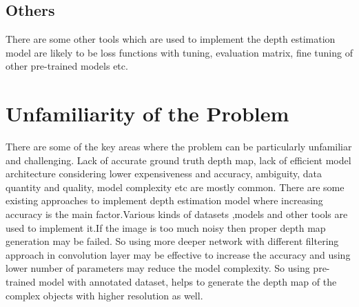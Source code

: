 \documentclass[a4paper,12pt,oneside]{book}
\begin{document}
\subsection{Others}
There are some other tools which are used to implement the depth estimation model are likely to be loss functions with tuning, evaluation matrix, fine tuning of other pre-trained models etc.


\section{Unfamiliarity of the Problem}
There are some of the key areas where the problem can be particularly unfamiliar and challenging. Lack of accurate ground truth depth map, lack of efficient model architecture considering lower expensiveness and accuracy,  ambiguity, data quantity and quality, model complexity etc are mostly common.
There are some existing approaches to implement depth estimation model where increasing accuracy is the main factor.Various kinds of datasets ,models and other tools are used to implement it.If the image is too much noisy then proper depth map generation may be failed. So using more deeper network with different filtering approach in convolution layer may be effective to increase the accuracy and using lower number of parameters may reduce the model complexity.
So using pre-trained model with annotated dataset, helps to generate the depth map of the complex objects with higher resolution as well.
\end{document}
